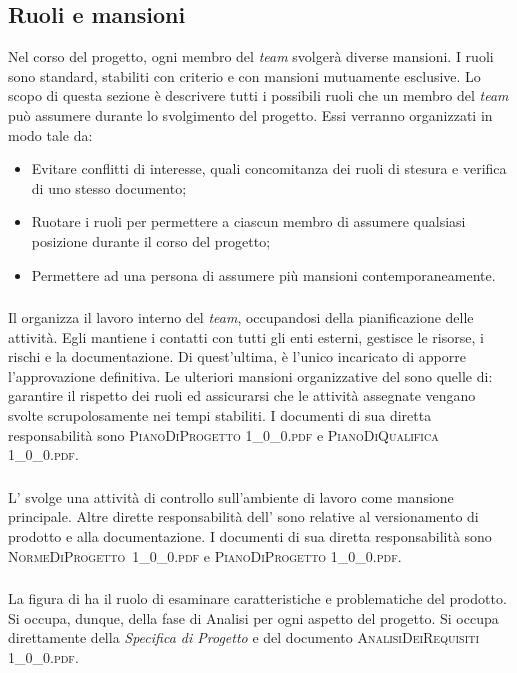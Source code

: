	\subsection{Ruoli e mansioni}
	Nel corso del progetto, ogni membro del \textit{team} svolgerà diverse mansioni. I ruoli sono standard, stabiliti con criterio e con mansioni mutuamente esclusive. Lo scopo di questa sezione è descrivere tutti i possibili ruoli che un membro del \textit{team} può assumere durante lo svolgimento del progetto. Essi verranno organizzati in modo tale da:
	\begin{itemize}
		\item Evitare conflitti di interesse, quali concomitanza dei ruoli di stesura e verifica di uno stesso documento;
		\item Ruotare i ruoli per permettere a ciascun membro di assumere qualsiasi posizione durante il corso del progetto;
		\item Permettere ad una persona di assumere più mansioni contemporaneamente.
	\end{itemize}

		\subsubsection{\RdP}
		Il \textit{\RdP} organizza il lavoro interno del \textit{team}, occupandosi della pianificazione delle attività. Egli mantiene i contatti con tutti gli enti esterni, gestisce le risorse, i rischi e la documentazione. Di quest'ultima, è l'unico incaricato di apporre l'approvazione definitiva. Le ulteriori mansioni organizzative del \textit{\RdP} sono quelle di: garantire il rispetto dei ruoli ed assicurarsi che le attività assegnate vengano svolte scrupolosamente nei tempi stabiliti. I documenti di sua diretta responsabilità sono \textsc{PianoDiProgetto 1\_0\_0.pdf} e \textsc{PianoDiQualifica 1\_0\_0.pdf}.

		\subsubsection{\Amm}
		L'\textit{\Amm} svolge una attività di controllo sull'ambiente di lavoro come mansione principale. Altre dirette responsabilità dell'\textit{\Amm} sono relative al versionamento di prodotto e alla documentazione. I documenti di sua diretta responsabilità sono \hbox{\textsc{NormeDiProgetto 1\_0\_0.pdf}} e \textsc{PianoDiProgetto 1\_0\_0.pdf}.
		
		\subsubsection{\Ana}
		La figura di \textit{\Ana} ha il ruolo di esaminare caratteristiche e problematiche del prodotto. Si occupa, dunque, della fase di Analisi per ogni aspetto del progetto. Si occupa direttamente della \textit{Specifica di Progetto} e del documento \textsc{AnalisiDeiRequisiti 1\_0\_0.pdf}.

